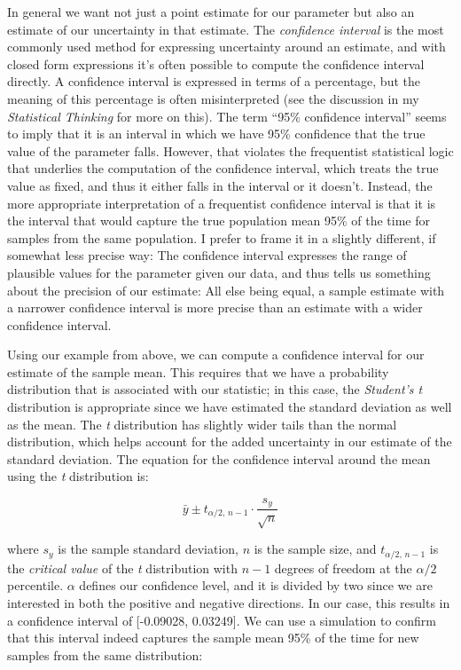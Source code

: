 In general we want not just a point estimate for our parameter but also an estimate of our uncertainty in that estimate.  The \textit{confidence interval} is the most commonly used method for expressing uncertainty around an estimate, and with closed form expressions it's often possible to compute the confidence interval directly. A confidence interval is expressed in terms of a percentage, but the meaning of this percentage is often misinterpreted (see the discussion in my \textit{Statistical Thinking} for more on this).  The term ``95\% confidence interval'' seems to imply that it is an interval in which we have 95\% confidence that the true value of the parameter falls.  However, that violates the frequentist statistical logic that underlies the computation of the confidence interval, which treats the true value as fixed, and thus it either falls in the interval or it doesn't.  Instead, the more appropriate interpretation of a frequentist confidence interval is that it is the interval that would capture the true population mean 95\% of the time for samples from the same population.  I prefer to frame it in a slightly different, if somewhat less precise way: The confidence interval expresses the range of plausible values for the parameter given our data, and thus tells us something about the precision of our estimate:  All else being equal, a sample estimate with a narrower confidence interval is more precise than an estimate with a wider confidence interval.

Using our example from above, we can compute a confidence interval for our estimate of the sample mean.  This requires that we have a probability distribution that is associated with our statistic; in this case, the \textit{Student's t} distribution is appropriate since we have estimated the standard deviation as well as the mean.  The \textit{t} distribution has slightly wider tails than the normal distribution, which helps account for the added uncertainty in our estimate of the standard deviation.  The equation for the confidence interval around the mean using the \textit{t} distribution is:

\begin{equation}
\bar{y} \pm t_{\alpha/2, \, n-1} \cdot \frac{s_y}{\sqrt{n}}
\end{equation}

where $s_y$ is the sample standard deviation, $n$ is the sample size, and $t_{\alpha/2, \, n-1}$ is the \textit{critical value} of the \textit{t} distribution with $n - 1$ degrees of freedom at the $\alpha/2$ percentile. $\alpha$ defines our confidence level, and it is divided by two since we are interested in both the positive and negative directions.  In our case, this results in a confidence interval of [-0.09028, 0.03249].  We can use a simulation to confirm that this interval indeed captures the sample mean 95\% of the time for new samples from the same distribution:

